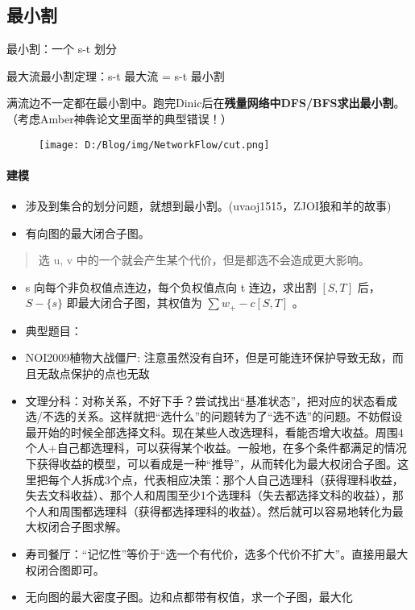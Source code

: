 \documentclass[]{ctexart}
\let\oldparagraph\paragraph
\renewcommand{\paragraph}[1]{\oldparagraph{#1}\mbox{}}
\begin{document}
\hypertarget{header-n461}{%
\subsection{最小割}\label{header-n461}}

最小割：一个 s-t 划分

最大流最小割定理：s-t 最大流 = s-t 最小割

满流边不一定都在最小割中。跑完Dinic后在\textbf{残量网络中DFS/BFS求出最小割}。（考虑Amber神犇论文里面举的典型错误！）

\begin{figure}
\centering
\texttt{[image: D:/Blog/img/NetworkFlow/cut.png]}
\caption{}
\end{figure}

\hypertarget{header-n468}{%
\paragraph{建模}\label{header-n468}}

\begin{itemize}
\item
  涉及到集合的划分问题，就想到最小割。(uvaoj1515，ZJOI狼和羊的故事)
\item
  有向图的最大闭合子图。
\end{itemize}

\begin{quote}
选 u, v 中的一个就会产生某个代价，但是都选不会造成更大影响。
\end{quote}

\begin{itemize}
\item
  s 向每个非负权值点连边，每个负权值点向 t 连边，求出割 \([S,T]\) 后，
  \(S-\{s\}\) 即最大闭合子图，其权值为 \(\sum w_+ - c[S,T]\) 。
\item
  典型题目：
\item
  NOI2009植物大战僵尸:
  注意虽然没有自环，但是可能连环保护导致无敌，而且无敌点保护的点也无敌
\item
  文理分科：对称关系，不好下手？尝试找出``基准状态''，把对应的状态看成选/不选的关系。这样就把``选什么''的问题转为了``选不选''的问题。不妨假设最开始的时候全部选择文科。现在某些人改选理科，看能否增大收益。周围4个人+自己都选理科，可以获得某个收益。一般地，在多个条件都满足的情况下获得收益的模型，可以看成是一种``推导''，从而转化为最大权闭合子图。这里把每个人拆成3个点，代表相应决策：那个人自己选理科（获得理科收益，失去文科收益）、那个人和周围至少1个选理科（失去都选择文科的收益），那个人和周围都选理科（获得都选择理科的收益）。然后就可以容易地转化为最大权闭合子图求解。
\item
  寿司餐厅：``记忆性''等价于``选一个有代价，选多个代价不扩大''。直接用最大权闭合图即可。
\item
  无向图的最大密度子图。边和点都带有权值，求一个子图，最大化
\end{itemize}
\end{document}
